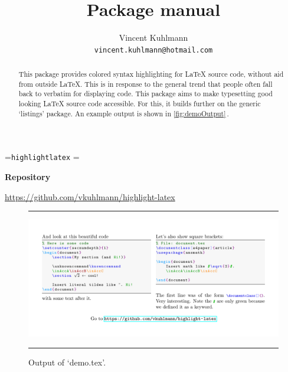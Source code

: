 \documentclass{ltxdoc}
\let\hll\lstinline
\begin{document}
\newbox\cmdintitle
\setbox\cmdintitle=\hbox{\hll|highlightlatex|}
\setbox\cmdintitle=\hbox{}
\def\defaultgobble{8}

\title{Package \usebox\cmdintitle{} manual}
\author{
	Vincent Kuhlmann\\
	\texttt{vincent.kuhlmann@hotmail.com}
}


\maketitle
\begin{abstract}
	This package provides colored syntax highlighting for \LaTeX{} source code, without aid from
	outside \LaTeX. This is in response to the general trend that people often fall back to verbatim
	for displaying code. This package aims to make typesetting good looking \LaTeX{} source code accessible.
	For this, it builds further on the generic `listings' package. An example output is
	shown in \autoref{fig:demoOutput}\,.
\end{abstract}

\bigskip

\begin{center}
	{\small\textbf{Repository}}

	\url{https://github.com/vkuhlmann/highlight-latex}
\end{center}

\vspace{5\baselineskip}

\begin{figure}[htbp]
	\centering
	\rule{2cm}{1pt}

	\bigskip
	\includegraphics[width=\textwidth,trim=1cm 1cm 1cm 1cm, clip]{demo.pdf}
	\caption{Output of `demo.tex'.}\label{fig:demoOutput}
	\bigskip
	\rule{2cm}{1pt}
\end{figure}

\vfil
\end{document}
